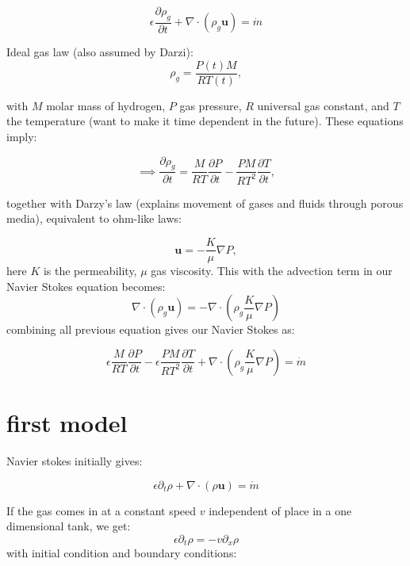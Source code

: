 \documentclass{article}
\begin{document}
\begin{equation}
    \epsilon\frac{\partial\rho_g}{\partial t}+\nabla\cdot(\rho_g \mathbf{u})=\dot m
\end{equation}

Ideal gas law (also assumed by Darzi):
\begin{equation}
    \rho_g = \frac{P(t)M}{RT(t)},
\end{equation}

with $M$ molar mass of hydrogen, $P$ gas pressure, $R$ universal gas constant, and $T$ the temperature (want to make it time dependent in the future). These equations imply:

\begin{equation*}
    \implies \frac{\partial \rho_g}{\partial t}=\frac{M}{RT}\frac{\partial P}{\partial t}-\frac{PM}{RT^2}\frac{\partial T}{\partial t},
\end{equation*}

together with Darzy's law (explains movement of gases and fluids through porous media), equivalent to ohm-like laws:

\begin{equation}\label{eq:darcy}
    \mathbf{u}=-\frac{K}{\mu}\nabla P,
\end{equation}
here $K$ is the permeability, $\mu$ gas viscosity. This with the advection term in our Navier Stokes equation becomes:
\begin{equation}
    \nabla\cdot(\rho_g\mathbf{u}) = -\nabla\cdot(\rho_g\frac{K}{\mu}\nabla P)
\end{equation}
combining all previous equation gives our Navier Stokes as:

\begin{equation}
    \epsilon \frac{M}{RT}\frac{\partial P}{\partial t}-\epsilon\frac{PM}{RT^2}\frac{\partial T}{\partial t} +\nabla \cdot (\rho_g\frac{K}{\mu}\nabla P)=\dot m
\end{equation}

\section{first model}

Navier stokes initially gives:

\begin{equation}\label{eq:dummy_navier}
    \epsilon \partial_t \rho + \nabla \cdot (\rho \mathbf{u}) = \dot m
\end{equation}

If the gas comes in at a constant speed $v$ independent of place in a one dimensional tank, we get:
\begin{equation}\label{eq:dummy_navier_constant_u}
    \epsilon \partial_t \rho = - v\partial_x \rho
\end{equation}
with initial condition and boundary conditions:
\end{document}
